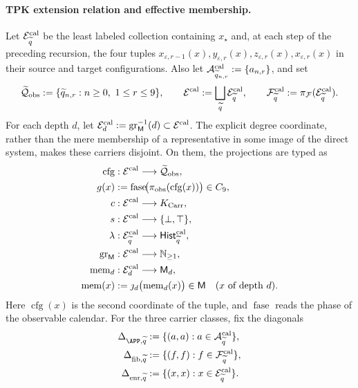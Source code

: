 \paragraph{TPK extension relation and effective membership.}
Let \(\mathcal E^{\rm cal}_{\widetilde q}\) be the least labeled collection
containing \(x_\star\) and, at each step of the preceding recursion, the four
tuples
\(x_{\varepsilon,r-1}(x),y_{\varepsilon,r}(x),
z_{\varepsilon,r}(x),x_{\varepsilon,r}(x)\) in their source and target
configurations. Also let
\(\mathcal A^{\rm cal}_{\widetilde q_{n,r}}:=\{a_{n,r}\}\), and set
\[
 \widetilde{\mathcal Q}_{\rm obs}:=
   \{\widetilde q_{n,r}:n\ge0,\ 1\le r\le9\},
 \qquad
 \mathcal E^{\rm cal}:=\bigsqcup_{\widetilde q}
     \mathcal E^{\rm cal}_{\widetilde q},
 \qquad
 \mathcal F^{\rm cal}_{\widetilde q}:=
     \pi_{\mathcal F}(\mathcal E^{\rm cal}_{\widetilde q}).
\]
For each depth \(d\), let
\(\mathcal E^{\rm cal}_d:=
\operatorname{gr}_{\mathsf M}^{-1}(d)\subset\mathcal E^{\rm cal}\). The
explicit degree coordinate, rather than the mere membership of a
representative in some image of the direct system, makes these carriers
disjoint. On them, the projections are typed as
\[
\begin{aligned}
 \operatorname{cfg}&:\mathcal E^{\rm cal}\longrightarrow
     \widetilde{\mathcal Q}_{\rm obs},\\
 g(x)&:=\operatorname{fase}\!
       \bigl(\pi_{\rm obs}(\operatorname{cfg}(x))\bigr)\in C_9,\\
 c&:\mathcal E^{\rm cal}\longrightarrow K_{\rm Carr},\\
 s&:\mathcal E^{\rm cal}\longrightarrow\{\bot,\top\},\\
 \lambda&:\mathcal E^{\rm cal}_{\widetilde q}
       \longrightarrow\mathsf{Hist}^{\rm cal}_{\widetilde q},\\
 \operatorname{gr}_{\mathsf M}&:\mathcal E^{\rm cal}
       \longrightarrow\mathbb N_{\ge1},\\
 \operatorname{mem}_d&:\mathcal E^{\rm cal}_d
       \longrightarrow\mathsf M_d,\\
 \operatorname{mem}(x)&:=
       \jmath_d\bigl(\operatorname{mem}_d(x)\bigr)\in\mathsf M
       \quad(x\text{ of depth }d).
\end{aligned}
\]
Here \(\operatorname{cfg}(x)\) is the second coordinate of the tuple, and
\(\operatorname{fase}\) reads the phase of the observable calendar. For the
three carrier classes, fix the diagonals
\[
\begin{aligned}
 \Delta_{\APP,\widetilde q}
   &:=\{(a,a):a\in\mathcal A^{\rm cal}_{\widetilde q}\},\\
 \Delta_{{\rm fib},\widetilde q}
   &:=\{(f,f):f\in\mathcal F^{\rm cal}_{\widetilde q}\},\\
 \Delta_{{\rm enr},\widetilde q}
   &:=\{(x,x):x\in\mathcal E^{\rm cal}_{\widetilde q}\}.
\end{aligned}
\]
